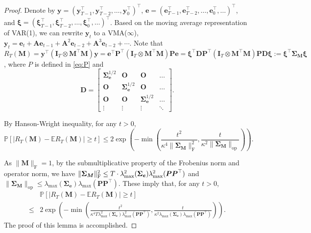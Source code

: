 \documentclass[12pt]{article}
\newcommand{\bm}{\boldsymbol}
\begin{document}
\begin{proof}
	Denote by $\bm{y}=(\bm{y}_{T-1}^\top,\bm{y}_{T-2}^\top,\dots,\bm{y}_0^\top)^\top$, $\bm{e}=(\bm{e}_{T-1}^\top,\bm{e}_{T-2}^\top,\dots,\bm{e}_0^\top,\dots)^\top$, and $\bm{\xi}=(\bm{\xi}_{T-1}^\top,\bm{\xi}_{T-2}^\top,\dots,\bm{\xi}_0^\top,\dots)^\top$. Based on the moving average representation of VAR(1), we can rewrite $\bm{y}_t$ to a VMA($\infty$), $\bm{y}_t=\bm{e}_t+\bm{A}\bm{e}_{t-1}+\bm{A}^2\bm{e}_{t-2}+\bm{A}^3\bm{e}_{t-2}+\cdots$. Note that $R_T(\bm{M})=\bm{y}^\top(\bm{I}_T\otimes \bm{M}^\top\bm{M})\bm{y}=\bm{e}^\top\bm{P}^\top(\bm{I}_T\otimes\bm{M}^\top\bm{M})\bm{P}\bm{e}=\bm{\xi}^\top\bm{D}\bm{P}^\top(\bm{I}_T\otimes\bm{M}^\top\bm{M})\bm{P}\bm{D}\bm{\xi}:=\bm{\xi}^\top\bm{\Sigma_M}\bm{\xi}$, where $P$ is defined in \eqref{eq:P} and
	\begin{equation}
	\bm{D}=\begin{bmatrix}
	\bm{\Sigma}_{\bm{e}}^{1/2} & \bm{O} & \bm{O} & \dots\\
	\bm{O} & \bm{\Sigma}_{\bm{e}}^{1/2} & \bm{O} & \dots\\
	\bm{O} & \bm{O} & \bm{\Sigma}_{\bm{e}}^{1/2} & \dots\\
	\vdots & \vdots & \vdots & \ddots
	\end{bmatrix}.
	\end{equation}
	
	By Hanson-Wright inequality, for any $t>0$,
	\begin{equation}
	\mathbb{P}[|R_T(\bm{M})-\mathbb{E}R_T(\bm{M})|\geq t]\leq 2\exp\left(-\min\left(\frac{t^2}{\kappa^4\|\bm{\Sigma_M}\|_{\text{F}}^2},\frac{t}{\kappa^2\|\bm{\Sigma_M}\|_{\text{op}}}\right)\right).
	\end{equation}
	
	As $\|\bm{M}\|_{\text{F}}=1$, by the submultiplicative property of the Frobenius norm and operator norm, we have $\|\bm{\Sigma_M}\|_{\textup{F}}^2\leq T\cdot\lambda_{\max}^2(\bm{\Sigma_e})\lambda_{\max}^2(\bm{P}\bm{P}^\top)$ and $\|\bm{\Sigma_M}\|_{\text{op}}\leq\lambda_{\max}(\bm{\Sigma_e})\lambda_{\max}(\bm{P}\bm{P}^\top)$. These imply that, for any $t>0$,
	\begin{equation}
	\begin{split}
	&\mathbb{P}[|R_T(\bm{M})-\mathbb{E}R_T(\bm{M})|\geq t]\\
	\leq& 2\exp\left(-\min\left(\frac{t^2}{\kappa^4T\lambda_{\max}^2(\bm{\Sigma_e})\lambda_{\max}^2(\bm{P}\bm{P}^\top)},\frac{t}{\kappa^2\lambda_{\max}(\bm{\Sigma_e})\lambda_{\max}(\bm{P}\bm{P}^\top)}\right)\right).
	\end{split}
	\end{equation}
The proof of this lemma is accomplished.	
\end{proof}
\end{document}
